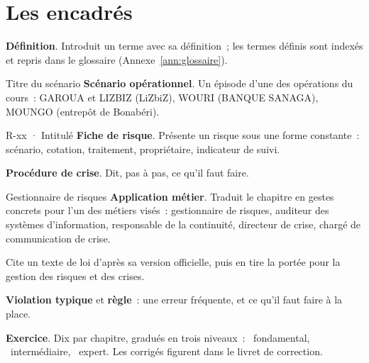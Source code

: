 \section*{Les encadrés}

\begin{boxdef}
\textbf{Définition}. Introduit un terme avec sa définition~; les termes
définis sont indexés et repris dans le glossaire (Annexe~\ref{ann:glossaire}).
\end{boxdef}

\begin{boxscenario}{Titre du scénario}
\textbf{Scénario opérationnel}. Un épisode d'une des opérations du
cours~: GAROUA et LIZBIZ (LiZbiZ), WOURI (BANQUE SANAGA), MOUNGO
(entrepôt de Bonabéri).
\end{boxscenario}

\begin{boxobjet}{R-xx · Intitulé}
\textbf{Fiche de risque}. Présente un risque sous une forme constante~:
scénario, cotation, traitement, propriétaire, indicateur de suivi.
\end{boxobjet}

\begin{boxprocedure}
\textbf{Procédure de crise}. Dit, pas à pas, ce qu'il faut faire.
\end{boxprocedure}

\begin{boxmetier}{Gestionnaire de risques}
\textbf{Application métier}. Traduit le chapitre en gestes concrets pour
l'un des métiers visés~: gestionnaire de risques, auditeur des systèmes
d'information, responsable de la continuité, directeur de crise, chargé de
communication de crise.
\end{boxmetier}

\begin{boxjuris}
Cite un texte de loi d'après sa version officielle, puis en tire la
portée pour la gestion des risques et des crises.
\end{boxjuris}

\begin{boxalert}
\textbf{Violation typique} et \textbf{règle}~: une erreur fréquente, et ce
qu'il faut faire à la place.
\end{boxalert}

\begin{boxexo}
\textbf{Exercice}. Dix par chapitre, gradués en trois niveaux~:
\niveaubase\ fondamental, \niveaumoyen\ intermédiaire, \niveauexpert\
expert. Les corrigés figurent dans le livret de correction.
\end{boxexo}

